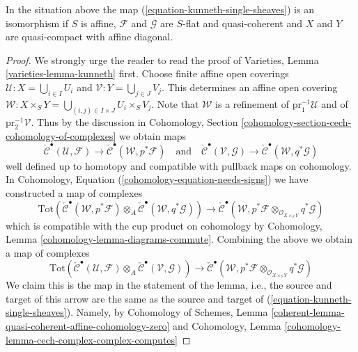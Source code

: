 \begin{lemma}
\label{lemma-kunneth-single-sheaf}
In the situation above the map (\ref{equation-kunneth-single-sheaves}) is an
isomorphism if $S$ is affine, $\mathcal{F}$ and $\mathcal{G}$ are $S$-flat and
quasi-coherent and $X$ and $Y$ are quasi-compact with affine diagonal.
\end{lemma}

\begin{proof}
We strongly urge the reader to read the proof of
Varieties, Lemma \ref{varieties-lemma-kunneth} first.
Choose finite affine open coverings
$\mathcal{U} : X = \bigcup_{i \in I} U_i$ and
$\mathcal{V} : Y = \bigcup_{j \in J} V_j$.
This determines an affine open covering
$\mathcal{W} : X \times_S Y = \bigcup_{(i, j) \in I \times J} U_i \times_S V_j$.
Note that $\mathcal{W}$ is a refinement of
$\text{pr}_1^{-1}\mathcal{U}$ and of $\text{pr}_2^{-1}\mathcal{V}$.
Thus by the discussion in Cohomology, Section
\ref{cohomology-section-cech-cohomology-of-complexes}
we obtain maps
$$
\check{\mathcal{C}}^\bullet(\mathcal{U}, \mathcal{F})
\to
\check{\mathcal{C}}^\bullet(\mathcal{W}, p^*\mathcal{F})
\quad\text{and}\quad
\check{\mathcal{C}}^\bullet(\mathcal{V}, \mathcal{G})
\to
\check{\mathcal{C}}^\bullet(\mathcal{W}, q^*\mathcal{G})
$$
well defined up to homotopy and compatible with pullback maps on cohomology.
In Cohomology, Equation (\ref{cohomology-equation-needs-signs})
we have constructed a map of complexes
$$
\text{Tot}(
\check{\mathcal{C}}^\bullet(\mathcal{W}, p^*\mathcal{F})
\otimes_A
\check{\mathcal{C}}^\bullet(\mathcal{W}, q^*\mathcal{G}))
\longrightarrow
\check{\mathcal{C}}^\bullet(\mathcal{W},
p^*\mathcal{F} \otimes_{\mathcal{O}_{X \times_S Y}}
q^*\mathcal{G})
$$
which is compatible with the cup product on cohomology by
Cohomology, Lemma \ref{cohomology-lemma-diagrams-commute}.
Combining the above we obtain a map of complexes
\begin{equation}
\label{equation-kunneth-on-cech}
\text{Tot}(
\check{\mathcal{C}}^\bullet(\mathcal{U}, \mathcal{F})
\otimes_A
\check{\mathcal{C}}^\bullet(\mathcal{V}, \mathcal{G}))
\to
\check{\mathcal{C}}^\bullet(\mathcal{W},
p^*\mathcal{F}
\otimes_{\mathcal{O}_{X \times_S Y}}
q^*\mathcal{G})
\end{equation}
We claim this is the map in the statement of the lemma, i.e.,
the source and target of this arrow are the same as the source
and target of (\ref{equation-kunneth-single-sheaves}). Namely, by
Cohomology of Schemes, Lemma
\ref{coherent-lemma-quasi-coherent-affine-cohomology-zero}
and
Cohomology, Lemma \ref{cohomology-lemma-cech-complex-complex-computes}

\end{proof}

